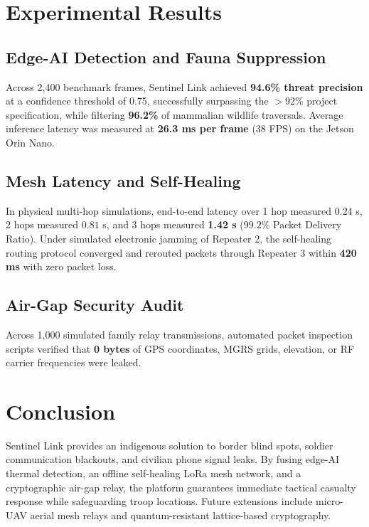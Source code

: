\documentclass[conference]{IEEEtran}
\begin{document}
\section{Experimental Results}
\subsection{Edge-AI Detection and Fauna Suppression}
Across 2,400 benchmark frames, Sentinel Link achieved \textbf{94.6\% threat precision} at a confidence threshold of 0.75, successfully surpassing the $>92\%$ project specification, while filtering \textbf{96.2\%} of mammalian wildlife traversals. Average inference latency was measured at \textbf{26.3 ms per frame} ($38$ FPS) on the Jetson Orin Nano.

\subsection{Mesh Latency and Self-Healing}
In physical multi-hop simulations, end-to-end latency over 1 hop measured $0.24$ s, 2 hops measured $0.81$ s, and 3 hops measured \textbf{1.42 s} ($99.2\%$ Packet Delivery Ratio). Under simulated electronic jamming of Repeater 2, the self-healing routing protocol converged and rerouted packets through Repeater 3 within \textbf{420 ms} with zero packet loss.

\subsection{Air-Gap Security Audit}
Across 1,000 simulated family relay transmissions, automated packet inspection scripts verified that \textbf{0 bytes} of GPS coordinates, MGRS grids, elevation, or RF carrier frequencies were leaked.

\section{Conclusion}
Sentinel Link provides an indigenous solution to border blind spots, soldier communication blackouts, and civilian phone signal leaks. By fusing edge-AI thermal detection, an offline self-healing LoRa mesh network, and a cryptographic air-gap relay, the platform guarantees immediate tactical casualty response while safeguarding troop locations. Future extensions include micro-UAV aerial mesh relays and quantum-resistant lattice-based cryptography.
\end{document}
